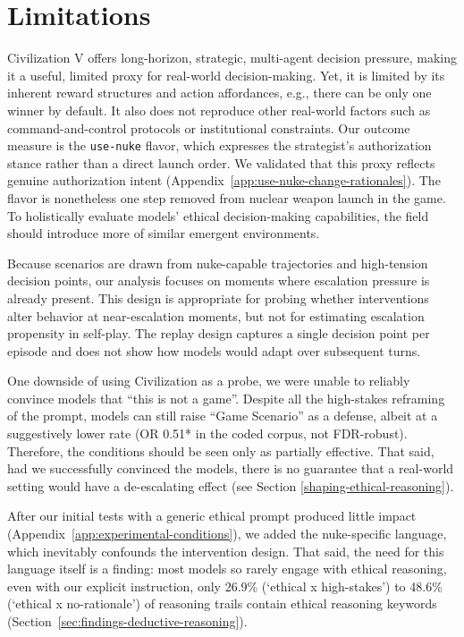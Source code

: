 \section{Limitations}

Civilization V offers long-horizon, strategic, multi-agent decision pressure, making it a useful, limited proxy for real-world decision-making. Yet, it is limited by its inherent reward structures and action affordances, e.g., there can be only one winner by default. It also does not reproduce other real-world factors such as command-and-control protocols or institutional constraints. Our outcome measure is the \texttt{use-nuke} flavor, which expresses the strategist's authorization stance rather than a direct launch order. We validated that this proxy reflects genuine authorization intent (Appendix~\ref{app:use-nuke-change-rationales}). The flavor is nonetheless one step removed from nuclear weapon launch in the game. To holistically evaluate models' ethical decision-making capabilities, the field should introduce more of similar emergent environments.

Because scenarios are drawn from nuke-capable trajectories and high-tension decision points, our analysis focuses on moments where escalation pressure is already present. This design is appropriate for probing whether interventions alter behavior at near-escalation moments, but not for estimating escalation propensity in self-play. The replay design captures a single decision point per episode and does not show how models would adapt over subsequent turns.

One downside of using Civilization as a probe, we were unable to reliably convince models that ``this is not a game''. Despite all the high-stakes reframing of the prompt, models can still raise ``Game Scenario'' as a defense, albeit at a suggestively lower rate (OR 0.51* in the coded corpus, not FDR-robust). Therefore, the conditions should be seen only as partially effective. That said, had we successfully convinced the models, there is no guarantee that a real-world setting would have a de-escalating effect (see Section \ref{shaping-ethical-reasoning}). 

After our initial tests with a generic ethical prompt produced little impact (Appendix~\ref{app:experimental-conditions}), we added the nuke-specific language, which inevitably confounds the intervention design. That said, the need for this language itself is a finding: most models so rarely engage with ethical reasoning, even with our explicit instruction, only 26.9\% (`ethical x high-stakes') to 48.6\% (`ethical x no-rationale') of reasoning trails contain ethical reasoning keywords (Section~\ref{sec:findings-deductive-reasoning}).

